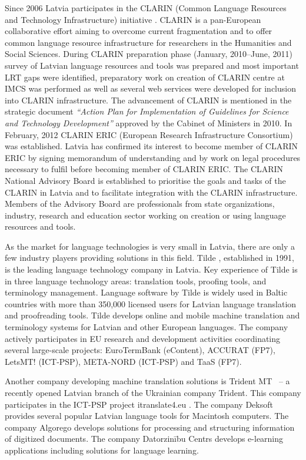 \begin{multicols}{2}
Since 2006 Latvia participates in the CLARIN (Common Language Resources and Technology Infrastructure) initiative \cite{metaClarin}.  CLARIN is a pan-European collaborative effort aiming to overcome current fragmentation and to offer common language resource infrastructure for researchers in the Humanities and Social Sciences.  During CLARIN preparation phase (January, 2010--June, 2011) survey of Latvian language resources and tools was prepared and most important LRT gaps were identified, preparatory work on creation of CLARIN centre at IMCS was performed as well as several web services were developed for inclusion into CLARIN infrastructure.  The advancement of CLARIN is mentioned in the strategic document \textit{“Action Plan for Implementation of Guidelines for Science and Technology Development”} approved by the Cabinet of Ministers in 2010.  In February, 2012 CLARIN ERIC (European Research Infrastructure Consortium) was established.  Latvia has confirmed its interest to become member of CLARIN ERIC by signing memorandum of understanding and by work on legal procedures necessary to fulfil before becoming member of CLARIN ERIC. The CLARIN National Advisory Board is established to prioritise the goals and tasks of the CLARIN in Latvia and to facilitate integration with the CLARIN infrastructure.  Members of the Advisory Board are professionals from state organizations, industry, research and education sector working on creation or using language resources and tools.

As the market for language technologies is very small in Latvia, there are only a few industry players providing solutions in this field.  Tilde \cite{Meta41}, established in 1991, is the leading language technology company in Latvia.  Key experience of Tilde is in three language technology areas: translation tools, proofing tools, and terminology management.  Language software by Tilde is widely used in Baltic countries with more than 350,000 licensed users for Latvian language translation and proofreading tools.  Tilde develops online and mobile machine translation and terminology systems for Latvian and other European languages.  The company actively participates in EU research and development activities coordinating several large-scale projects: EuroTermBank (eContent), ACCURAT (FP7), LetsMT! (ICT-PSP), META-NORD (ICT-PSP) and TaaS (FP7).

Another company developing machine translation solutions is Trident MT \cite{Meta42}~-- a recently opened Latvian branch of the Ukrainian company Trident.  This company participates in the ICT-PSP project itranslate4.eu \cite{Meta43}.  The company Deksoft \cite{MetaRef1} provides several popular Latvian language tools for Macintosh computers.  The company Algorego \cite{Meta44} develops solutions for processing and structuring information of digitized documents.  The company Datorzinību Centrs \cite{Meta45} develops e-learning applications including solutions for language learning.


\end{multicols}

